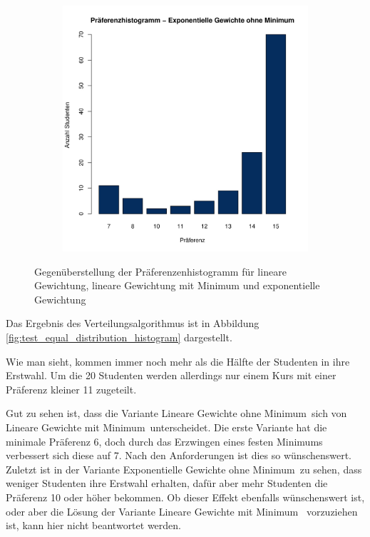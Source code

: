\begin{figure}[ht]
\begin{subfigure}{0.49\textwidth}
				\end{subfigure}
			\begin{subfigure}{0.49\textwidth}
				\includegraphics[width=1.0\textwidth]{./testing/images/NormalDistPreferencesHistExpo.jpg}
			\end{subfigure}
				\caption{Gegenüberstellung der Präferenzenhistogramm für lineare Gewichtung, lineare Gewichtung mit Minimum und exponentielle Gewichtung}
				\label{fig:test_norm_distribution_histogram}
			\end{figure}
		
			Das Ergebnis des Verteilungsalgorithmus ist in  Abbildung \ref{fig:test_equal_distribution_histogram} dargestellt.\newline
			
			Wie man sieht, kommen immer noch mehr als die Hälfte der Studenten in ihre Erstwahl.
			Um die 20 Studenten werden allerdings nur einem Kurs mit einer Präferenz kleiner 11 zugeteilt.\newline
			
			Gut zu sehen ist, dass die Variante \glqq Lineare Gewichte ohne Minimum\grqq~sich von \glqq Lineare Gewichte mit Minimum\grqq~unterscheidet.
			Die erste Variante hat die minimale Präferenz 6, doch durch das Erzwingen eines festen Minimums verbessert sich diese auf 7.
			Nach den Anforderungen ist dies so wünschenswert.
			Zuletzt ist in der Variante \glqq Exponentielle Gewichte ohne Minimum\grqq~zu sehen, dass weniger Studenten ihre Erstwahl erhalten, dafür aber mehr Studenten die Präferenz 10 oder höher bekommen.
            Ob dieser Effekt ebenfalls wünschenswert ist, oder aber die Lösung der Variante \glqq Lineare Gewichte mit Minimum\grqq~ vorzuziehen ist, kann hier nicht beantwortet werden. 
			
